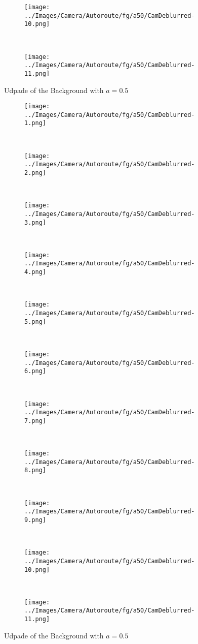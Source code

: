 \begin{frame}[allowframebreaks]
\begin{figure}[h]
\begin{subfigure}{0.20\textwidth}
\texttt{[image: ../Images/Camera/Autoroute/fg/a50/CamDeblurred-10.png]}
\end{subfigure}
~
\begin{subfigure}{0.20\textwidth}
\texttt{[image: ../Images/Camera/Autoroute/fg/a50/CamDeblurred-11.png]}
\end{subfigure}
\caption{Udpade of the Background with $a=0.5$}
\label{fig:Udpade}
\end{figure}
%
\begin{figure}[h]
\centering
\begin{subfigure}{0.20\textwidth}
\texttt{[image: ../Images/Camera/Autoroute/fg/a50/CamDeblurred-1.png]}
\end{subfigure}
~
\begin{subfigure}{0.20\textwidth}
\texttt{[image: ../Images/Camera/Autoroute/fg/a50/CamDeblurred-2.png]}
\end{subfigure}
~
\begin{subfigure}{0.20\textwidth}
\texttt{[image: ../Images/Camera/Autoroute/fg/a50/CamDeblurred-3.png]}
\end{subfigure}
~
\begin{subfigure}{0.20\textwidth}
\texttt{[image: ../Images/Camera/Autoroute/fg/a50/CamDeblurred-4.png]}
\end{subfigure}
~
\begin{subfigure}{0.20\textwidth}
\texttt{[image: ../Images/Camera/Autoroute/fg/a50/CamDeblurred-5.png]}
\end{subfigure}
~
\begin{subfigure}{0.20\textwidth}
\texttt{[image: ../Images/Camera/Autoroute/fg/a50/CamDeblurred-6.png]}
\end{subfigure}
~
\begin{subfigure}{0.20\textwidth}
\texttt{[image: ../Images/Camera/Autoroute/fg/a50/CamDeblurred-7.png]}
\end{subfigure}
~
\begin{subfigure}{0.20\textwidth}
\texttt{[image: ../Images/Camera/Autoroute/fg/a50/CamDeblurred-8.png]}
\end{subfigure}
~
\begin{subfigure}{0.20\textwidth}
\texttt{[image: ../Images/Camera/Autoroute/fg/a50/CamDeblurred-9.png]}
\end{subfigure}
~
\begin{subfigure}{0.20\textwidth}
\texttt{[image: ../Images/Camera/Autoroute/fg/a50/CamDeblurred-10.png]}
\end{subfigure}
~
\begin{subfigure}{0.20\textwidth}
\texttt{[image: ../Images/Camera/Autoroute/fg/a50/CamDeblurred-11.png]}
\end{subfigure}
\caption{Udpade of the Background with $a=0.5$}
\label{fig:Udpade}
\end{figure}
%
\end{frame}
